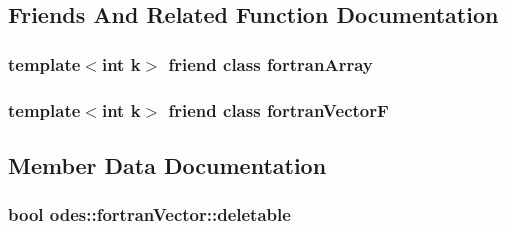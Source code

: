 \subsection{Friends And Related Function Documentation}
\hypertarget{classodes_1_1fortranVector_a073cb7f07821b815ad65e098723e8a53}{}
\subsubsection[{fortran\+Array}]{\setlength{\rightskip}{0pt plus 5cm}template$<$int k$>$ friend class {\bf fortran\+Array}\hspace{0.3cm}{\ttfamily [friend]}}\label{classodes_1_1fortranVector_a073cb7f07821b815ad65e098723e8a53}
\hypertarget{classodes_1_1fortranVector_a6f2443030a60ee3f140d4969edbd2914}{}
\subsubsection[{fortran\+Vector\+F}]{\setlength{\rightskip}{0pt plus 5cm}template$<$int k$>$ friend class {\bf fortran\+Vector\+F}\hspace{0.3cm}{\ttfamily [friend]}}\label{classodes_1_1fortranVector_a6f2443030a60ee3f140d4969edbd2914}


\subsection{Member Data Documentation}
\hypertarget{classodes_1_1fortranVector_ace9b5d1e721b6f82ed090350181557b6}{}
\subsubsection[{deletable}]{\setlength{\rightskip}{0pt plus 5cm}bool odes\+::fortran\+Vector\+::deletable\hspace{0.3cm}{\ttfamily [protected]}}\label{classodes_1_1fortranVector_ace9b5d1e721b6f82ed090350181557b6}
\hypertarget{classodes_1_1fortranVector_a4734531bec0ccbaf24f22c12969580db}{}
